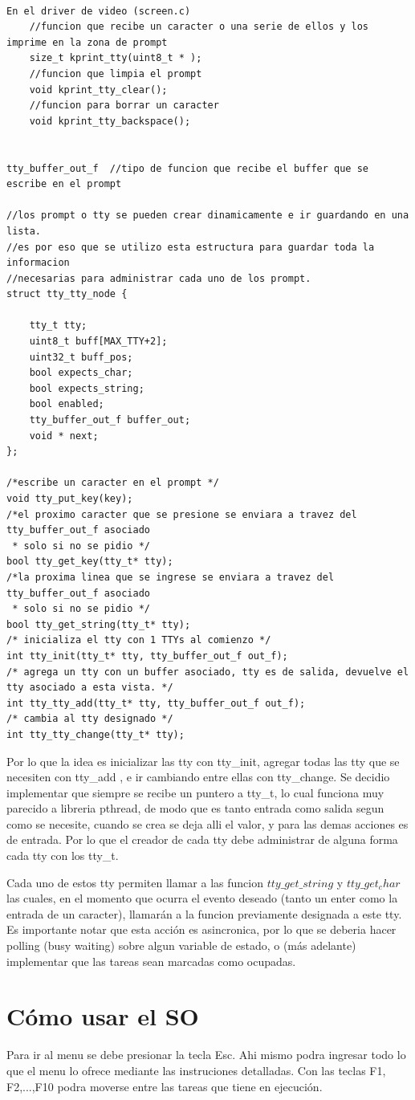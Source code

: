 \documentclass[a4paper,10pt]{article}
\begin{document}
\begin{verbatim}

En el driver de video (screen.c)
    //funcion que recibe un caracter o una serie de ellos y los imprime en la zona de prompt
    size_t kprint_tty(uint8_t * );
    //funcion que limpia el prompt
    void kprint_tty_clear();
    //funcion para borrar un caracter
    void kprint_tty_backspace();


tty_buffer_out_f  //tipo de funcion que recibe el buffer que se escribe en el prompt

//los prompt o tty se pueden crear dinamicamente e ir guardando en una lista.
//es por eso que se utilizo esta estructura para guardar toda la informacion 
//necesarias para administrar cada uno de los prompt.
struct tty_tty_node {
    
    tty_t tty;
    uint8_t buff[MAX_TTY+2];
    uint32_t buff_pos;
    bool expects_char;
    bool expects_string;
    bool enabled;
    tty_buffer_out_f buffer_out;
    void * next;
};

/*escribe un caracter en el prompt */
void tty_put_key(key);
/*el proximo caracter que se presione se enviara a travez del tty_buffer_out_f asociado
 * solo si no se pidio */
bool tty_get_key(tty_t* tty);
/*la proxima linea que se ingrese se enviara a travez del tty_buffer_out_f asociado
 * solo si no se pidio */
bool tty_get_string(tty_t* tty);
/* inicializa el tty con 1 TTYs al comienzo */
int tty_init(tty_t* tty, tty_buffer_out_f out_f);
/* agrega un tty con un buffer asociado, tty es de salida, devuelve el tty asociado a esta vista. */
int tty_tty_add(tty_t* tty, tty_buffer_out_f out_f);
/* cambia al tty designado */
int tty_tty_change(tty_t* tty);
\end{verbatim}

Por lo que la idea es inicializar las tty con tty\_init, agregar todas las tty que se necesiten con tty\_add , e ir cambiando entre ellas con tty\_change. Se decidio implementar que siempre se recibe un puntero a tty\_t, lo cual funciona muy parecido a libreria pthread, de modo que es tanto entrada como salida segun como se necesite, cuando se crea se deja alli el valor, y para las demas acciones es de entrada. Por lo que el creador de cada tty debe administrar de alguna forma cada tty con los tty\_t.

Cada uno de estos tty permiten llamar a las funcion $tty\_get\_string$ y $tty\_get_char$ las cuales, en el momento que ocurra el evento deseado (tanto un enter como la entrada de un caracter), llamarán a la funcion previamente designada a este tty. Es importante notar que esta acción es asincronica, por lo que se deberia hacer polling (busy waiting) sobre algun variable de estado, o (más adelante) implementar que las tareas sean marcadas como ocupadas.

\newpage
\section{C\'omo usar el SO}
Para ir al menu se debe presionar la tecla Esc. Ahi mismo podra ingresar todo lo que el menu lo ofrece mediante las instruciones detalladas.
Con las teclas F1, F2,...,F10 podra moverse entre las tareas que tiene en ejecución.
\end{document}
